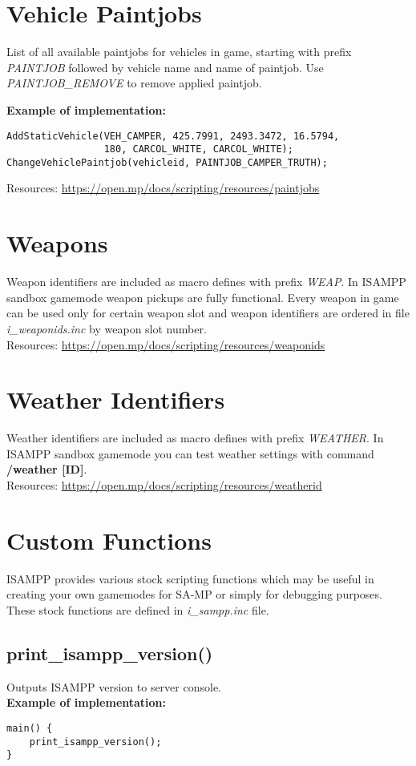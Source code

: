 \documentclass{article}
\begin{document}
\section{Vehicle Paintjobs}
\begin{sloppypar}
List of all available paintjobs for vehicles in game, starting with prefix \textit{PAINTJOB} followed by vehicle name and name of paintjob. Use \textit{PAINTJOB\_REMOVE} to remove applied paintjob.
\end{sloppypar}
\bigskip
\noindent \textbf{Example of implementation:}
\begin{verbatim}
AddStaticVehicle(VEH_CAMPER, 425.7991, 2493.3472, 16.5794,
                 180, CARCOL_WHITE, CARCOL_WHITE);
ChangeVehiclePaintjob(vehicleid, PAINTJOB_CAMPER_TRUTH);
\end{verbatim}
\bigskip
Resources: \url{https://open.mp/docs/scripting/resources/paintjobs}

\section{Weapons}
Weapon identifiers are included as macro defines with prefix \textit{WEAP}. In ISAMPP sandbox gamemode weapon pickups are fully functional. Every weapon in game can be used only for certain weapon slot and weapon identifiers are ordered in file \textit{i\_weaponids.inc} by weapon slot number.
\bigskip
\\Resources: \url{https://open.mp/docs/scripting/resources/weaponids}

\section{Weather Identifiers}
Weather identifiers are included as macro defines with prefix \textit{WEATHER}. In ISAMPP sandbox gamemode you can test weather settings with command \textbf{/weather [ID]}.
\bigskip
\\Resources: \url{https://open.mp/docs/scripting/resources/weatherid}


\newpage
\section{Custom Functions}
ISAMPP provides various stock scripting functions which may be useful in creating your own gamemodes for SA-MP or simply for debugging purposes. These stock functions are defined in \textit{i\_sampp.inc} file.

\subsection{print\_isampp\_version()}
Outputs ISAMPP version to server console.
\bigskip
\\\textbf{Example of implementation:}
\begin{verbatim}
main() {
    print_isampp_version();
}
\end{verbatim}
\end{document}
